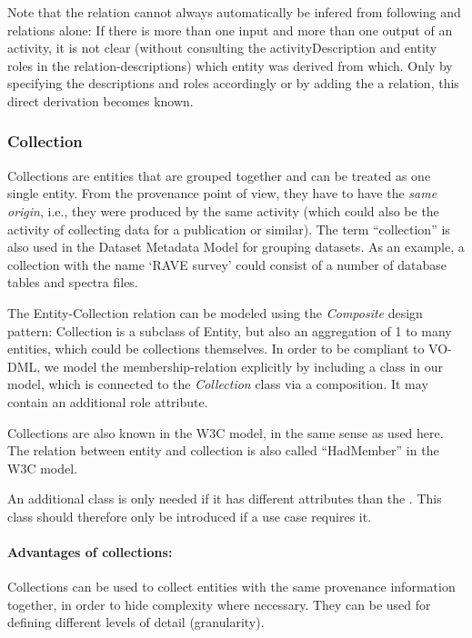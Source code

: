 Note that the  relation
cannot always automatically be infered from following  and  relations alone:
If there is more than one input and more than one output of an activity, it is not clear (without 
consulting the activityDescription and entity roles in the relation-descriptions) which entity was derived from which.
Only by specifying the descriptions and roles accordingly or by adding the a  relation,
this direct derivation becomes known.



\subsubsection{Collection}\label{sec:collection}
Collections are entities that are grouped together and can be treated as one single entity. 
From the provenance point of view, they have to have the \emph{same origin}, i.e., they were 
produced by the same activity (which could also be the activity of collecting
data for a publication or similar). The term ``collection'' is 
also used in the Dataset Metadata Model for grouping datasets.
As an example, a collection 
with the name `RAVE survey' could consist of a number of database tables and spectra files.


The Entity-Collection relation can be modeled using the \emph{Composite} design pattern: 
Collection is a subclass of Entity, but also an aggregation of 1 to many entities, 
which could be collections themselves. 
In order to be compliant to VO-DML, we model the membership-relation explicitly 
by including a  class in our model, which is connected to the
\emph{Collection} class via a composition. It may contain an additional role attribute.

Collections are also known in the W3C model, in the same sense as used here.
The relation between entity and collection is also called ``HadMember'' in the W3C model.

An additional class  is only 
needed if it has different attributes than 
the . This class should therefore only be introduced if a use case requires it.

\paragraph{Advantages of collections:} Collections can be used to collect entities with the same provenance information together, 
    in order to hide complexity where necessary. They can be used for defining 
    different levels of detail (granularity).

